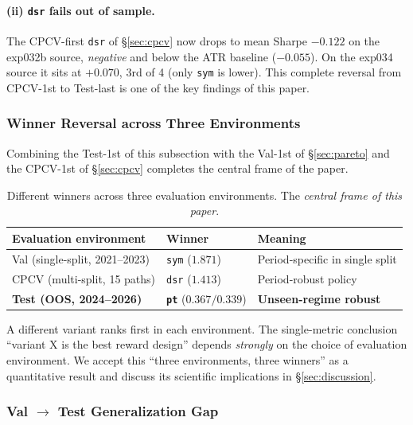 \documentclass[11pt, a4paper]{article}
\begin{document}
\paragraph{(ii) \texttt{dsr} fails out of sample.}
The CPCV-first \texttt{dsr} of \S\ref{sec:cpcv} now drops to mean Sharpe
$-0.122$ on the exp032b source, \emph{negative} and below the ATR baseline
($-0.055$). On the exp034 source it sits at $+0.070$, 3rd of 4 (only
\texttt{sym} is lower). This complete reversal from CPCV-1st to Test-last is
one of the key findings of this paper.

\subsubsection{Winner Reversal across Three Environments}
\label{sec:oos_three_env_reversal}

Combining the Test-1st of this subsection with the Val-1st of
\S\ref{sec:pareto} and the CPCV-1st of \S\ref{sec:cpcv} completes the central
frame of the paper.

\begin{table}[!htbp]
\centering
\caption{Different winners across three evaluation environments. The
\emph{central frame of this paper}.}
\begin{tabular}{lll}
\toprule
Evaluation environment & Winner & Meaning \\
\midrule
Val (single-split, 2021--2023) & \texttt{sym} ($1.871$) & Period-specific in single split \\
CPCV (multi-split, 15 paths) & \texttt{dsr} ($1.413$) & Period-robust policy \\
\textbf{Test (OOS, 2024--2026)} & \textbf{\texttt{pt}} ($0.367 / 0.339$) & \textbf{Unseen-regime robust} \\
\bottomrule
\end{tabular}
\label{tab:three_env_reversal}
\end{table}

A different variant ranks first in each environment. The single-metric
conclusion ``variant X is the best reward design'' depends \emph{strongly}
on the choice of evaluation environment. We accept this ``three environments,
three winners'' as a quantitative result and discuss its scientific
implications in \S\ref{sec:discussion}.

\subsubsection{Val $\to$ Test Generalization Gap}
\label{sec:oos_gap}
\end{document}
